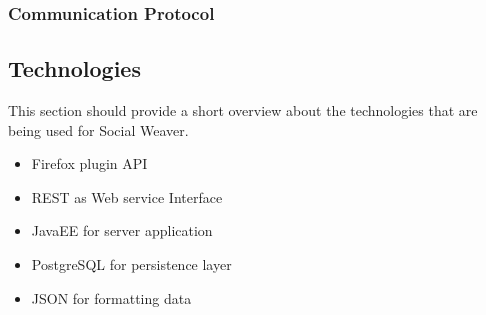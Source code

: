 \subsubsection{Communication Protocol}\label{communication_protocol}


\subsection{Technologies}
This section should provide a short overview about the technologies that are being used for Social Weaver. 
\begin{itemize}
\item Firefox plugin API
\item REST as Web service Interface
\item JavaEE for server application 
\item PostgreSQL for persistence layer
\item JSON for formatting data
\end{itemize}
